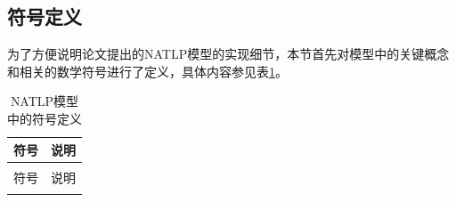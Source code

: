 \subsection{符号定义}

为了方便说明论文提出的NATLP模型的实现细节，本节首先对模型中的关键概念和相关的数学符号进行了定义，具体内容参见表\ref{definition}。

\setlength{\tabcolsep}{20pt}

\renewcommand\arraystretch{1.2}
\begin{longtable}[htbp]{cc}
  \caption{NATLP模型中的符号定义}
  \label{definition}\\
  \toprule
  符号  & 说明\\
  \midrule
  \endfirsthead
  \caption{NATLP模型中的符号定义}\\
  \toprule
  符号  & 说明 \\
  \midrule
  \endhead
  \hline
  \endfoot
  \bottomrule
  \endlastfoot
  

\end{longtable}
